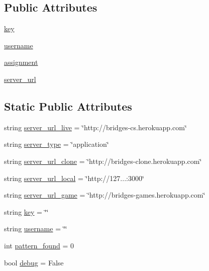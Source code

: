 \subsection*{Public Attributes}
\begin{DoxyCompactItemize}
\item 
\hyperlink{classbridges_1_1connector_1_1_connector_afeae8bc992dfa4336a6cc766d8414e6f}{key}
\item 
\hyperlink{classbridges_1_1connector_1_1_connector_adeb8d1b493eae70c24127fb175e1bfe7}{username}
\item 
\hyperlink{classbridges_1_1connector_1_1_connector_a2df020c062b6224d4eeb2c5407c02656}{assignment}
\item 
\hyperlink{classbridges_1_1connector_1_1_connector_abcc06e345e43916cf975eb200187d911}{server\+\_\+url}
\end{DoxyCompactItemize}
\subsection*{Static Public Attributes}
\begin{DoxyCompactItemize}
\item 
string \hyperlink{classbridges_1_1connector_1_1_connector_a10c26bfaf2718f837e7bddfd7715b729}{server\+\_\+url\+\_\+live} = \char`\"{}http\+://bridges-\/cs.\+herokuapp.\+com\char`\"{}
\item 
string \hyperlink{classbridges_1_1connector_1_1_connector_ab5146d539819322f0b0e121a56356ba2}{server\+\_\+type} = \char`\"{}application\char`\"{}
\item 
string \hyperlink{classbridges_1_1connector_1_1_connector_a9048518314ac4902eda88f8457154b63}{server\+\_\+url\+\_\+clone} = \char`\"{}http\+://bridges-\/clone.\+herokuapp.\+com\char`\"{}
\item 
string \hyperlink{classbridges_1_1connector_1_1_connector_a7d58b50fbd7d10f805957ec620135ef7}{server\+\_\+url\+\_\+local} = \char`\"{}http\+://127...\+:3000\char`\"{}
\item 
string \hyperlink{classbridges_1_1connector_1_1_connector_ad2c0c9e4bff85bbfb05816fc9a3515fc}{server\+\_\+url\+\_\+game} = \char`\"{}http\+://bridges-\/games.\+herokuapp.\+com\char`\"{}
\item 
string \hyperlink{classbridges_1_1connector_1_1_connector_a3b577c34402fea1910f56fd9cac51c07}{key} = \char`\"{}\char`\"{}
\item 
string \hyperlink{classbridges_1_1connector_1_1_connector_af2f4f996092cf63a5e7940ca93a2c6b7}{username} = \char`\"{}\char`\"{}
\item 
int \hyperlink{classbridges_1_1connector_1_1_connector_ad137981eae887e1f050216edb7670d35}{pattern\+\_\+found} = 0
\item 
bool \hyperlink{classbridges_1_1connector_1_1_connector_a05ea0150f79561e26b725654fe8ff7dc}{debug} = False
\end{DoxyCompactItemize}


